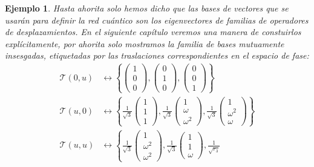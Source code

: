 \documentclass[a4paper]{report}
\newtheorem{example}{Ejemplo}
\begin{document}
\begin{example}
    Hasta ahorita solo hemos dicho que las bases de vectores
    que se usarán para definir la red cuántico son los
    eigenvectores de familias de operadores de
    desplazamientos. En el siguiente capítulo veremos una
    manera de constuirlos explícitamente, por ahorita solo
    mostramos la familia de bases mutuamente insesgadas,
    etiquetadas por las traslaciones correspondientes en el
    espacio de fase:
    \begin{align}
      \mathcal T(0,u)
      &\leftrightarrow \left\{
      \begin{pmatrix} 1\\0\\0 \end{pmatrix},
      \begin{pmatrix} 0\\1\\0 \end{pmatrix},
      \begin{pmatrix} 0\\0\\1 \end{pmatrix} 
      \right\} \\
      \mathcal T(u,0)
      &\leftrightarrow \left\{
        \frac{1}{\sqrt{3}}
        \begin{pmatrix} 1\\1\\1 \end{pmatrix},
        \frac{1}{\sqrt{3}}
        \begin{pmatrix} 1\\ \omega\\ \omega^2 \end{pmatrix},
        \frac{1}{\sqrt{3}}
        \begin{pmatrix} 1\\ \omega^2\\ \omega \end{pmatrix} 
      \right\} \\
      \mathcal T(u,u)
      &\leftrightarrow \left\{
        \frac{1}{\sqrt{3}}
        \begin{pmatrix} 1\\ \omega^2 \\ \omega^2
        \end{pmatrix},
        \frac{1}{\sqrt{3}}
        \begin{pmatrix} 1\\1\\ \omega \end{pmatrix},
        \frac{1}{\sqrt{r_3}}

\end{align}
\end{example}
\end{document}
